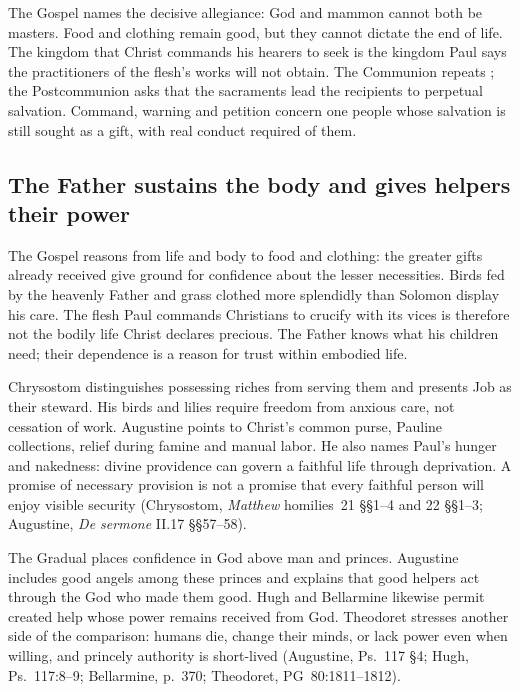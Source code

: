 The Gospel names the decisive allegiance: God and mammon cannot both be
masters. Food and clothing remain good, but they cannot dictate the end of
life. The kingdom that Christ commands his hearers to seek is the kingdom
Paul says the practitioners of the flesh's works will not obtain. The
Communion repeats ; the Postcommunion asks
that the sacraments lead the recipients to perpetual salvation. Command,
warning and petition concern one people whose salvation is still sought as
a gift, with real conduct required of them.

\subsection*{The Father sustains the body and gives helpers their power\enspace{}}

The Gospel reasons from life and body to food and clothing: the greater gifts
already received give ground for confidence about the lesser necessities.
Birds fed by the heavenly Father and grass clothed more splendidly than
Solomon display his care. The flesh Paul commands Christians to crucify with
its vices is therefore not the bodily life Christ declares precious. The
Father knows what his children need; their dependence is a reason for trust
within embodied life.

Chrysostom distinguishes possessing riches from serving them and presents Job
as their steward. His birds and lilies require freedom from anxious care,
not cessation of work. Augustine points to Christ's common purse, Pauline
collections, relief during famine and manual labor. He also names Paul's
hunger and nakedness: divine providence can govern a faithful life through
deprivation. A promise of necessary provision is not a promise that every
faithful person will enjoy visible security (Chrysostom, \emph{Matthew}
homilies~21 §§1--4 and 22 §§1--3; Augustine, \emph{De sermone} II.17
§§57--58).

The Gradual places confidence in God above man and princes. Augustine includes
good angels among these princes and explains that good helpers act through
the God who made them good. Hugh and Bellarmine likewise permit created help
whose power remains received from God. Theodoret stresses another side of
the comparison: humans die, change their minds, or lack power even when
willing, and princely authority is short-lived (Augustine, Ps.~117 §4;
Hugh, Ps.~117:8--9; Bellarmine, p.~370; Theodoret, PG~80:1811--1812).

